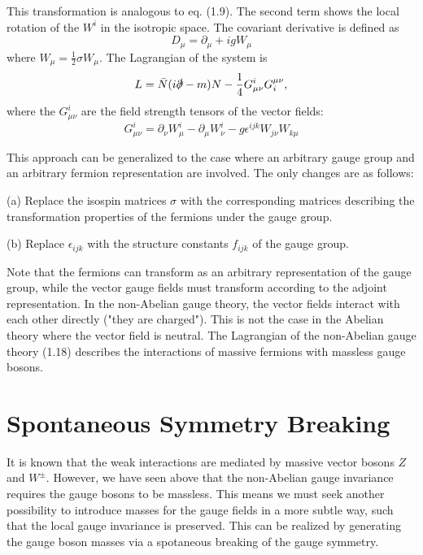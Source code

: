 This transformation is analogous to eq. (1.9). The second term shows the local rotation of the $W^i$ in the isotropic space. The covariant derivative is defined as
\begin{equation}
D_\mu = \partial_\mu + igW_\mu
\end{equation}
where  $W_\mu=\frac{1}{2}\sigma W_\mu$. The Lagrangian of the system is 
\begin{equation}
L=\bar{N}(i\slashed{\partial}-m)N-\frac{1}{4}G_{\mu\nu}^i G_i^{\mu\nu},
\end{equation} 
where the $G_{\mu\nu}^i$ are the field strength tensors of the vector fields:
\begin{equation}
G_{\mu\nu}^i = \partial_\nu W_\mu^i - \partial_\mu W_\nu^i -g\epsilon^{ijk} W_{j\nu}W_{k\mu}
\end{equation}

This approach can be generalized to the case where an arbitrary gauge group and an arbitrary fermion representation are involved. The only changes are as follows:

(a) Replace the isospin matrices $\sigma$ with the corresponding matrices describing the transformation properties of the fermions under the gauge group.

(b) Replace $\epsilon_{ijk}$ with the structure constants $f_{ijk}$ of the gauge group. 

Note that the fermions can transform as an arbitrary representation of the gauge group, while the vector gauge fields must transform according to the adjoint representation. In the non-Abelian gauge theory, the vector fields interact with each other directly ("they are charged"). This is not the case in the Abelian theory where the vector field is neutral. The Lagrangian of the non-Abelian gauge theory (1.18) describes the interactions of massive fermions with massless gauge bosons.


\section{Spontaneous Symmetry Breaking}
It is known that the weak interactions are mediated by massive vector bosons $Z$ and $W^{\pm}$. However, we have seen above that the non-Abelian gauge invariance requires the gauge bosons to be massless. This means we must seek another possibility to introduce masses for the gauge fields in a more subtle way, such that the local gauge invariance is preserved. This can be realized by generating the gauge boson masses via a spotaneous breaking of the gauge symmetry. 

